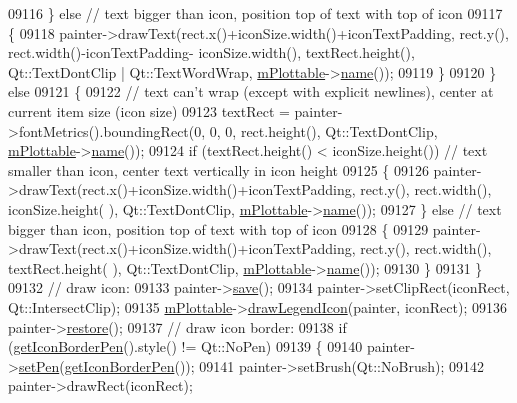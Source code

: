 \begin{DoxyCode}
09116     \} \textcolor{keywordflow}{else} \textcolor{comment}{// text bigger than icon, position top of text with top of icon}
09117     \{
09118       painter->drawText(rect.x()+iconSize.width()+iconTextPadding, rect.y(), rect.width()-iconTextPadding-
      iconSize.width(), textRect.height(), Qt::TextDontClip | Qt::TextWordWrap, 
      \hyperlink{a00048_ada647fb4b22971a1a424e15b4f6af0d9}{mPlottable}->\hyperlink{a00024_a1affc1972938e4364a9325e4e4e4dcea}{name}());
09119     \}
09120   \} \textcolor{keywordflow}{else}
09121   \{
09122     \textcolor{comment}{// text can't wrap (except with explicit newlines), center at current item size (icon size)}
09123     textRect = painter->fontMetrics().boundingRect(0, 0, 0, rect.height(), Qt::TextDontClip, 
      \hyperlink{a00048_ada647fb4b22971a1a424e15b4f6af0d9}{mPlottable}->\hyperlink{a00024_a1affc1972938e4364a9325e4e4e4dcea}{name}());
09124     \textcolor{keywordflow}{if} (textRect.height() < iconSize.height()) \textcolor{comment}{// text smaller than icon, center text vertically in icon
       height}
09125     \{
09126       painter->drawText(rect.x()+iconSize.width()+iconTextPadding, rect.y(), rect.width(), iconSize.height(
      ), Qt::TextDontClip, \hyperlink{a00048_ada647fb4b22971a1a424e15b4f6af0d9}{mPlottable}->\hyperlink{a00024_a1affc1972938e4364a9325e4e4e4dcea}{name}());
09127     \} \textcolor{keywordflow}{else} \textcolor{comment}{// text bigger than icon, position top of text with top of icon}
09128     \{
09129       painter->drawText(rect.x()+iconSize.width()+iconTextPadding, rect.y(), rect.width(), textRect.height(
      ), Qt::TextDontClip, \hyperlink{a00048_ada647fb4b22971a1a424e15b4f6af0d9}{mPlottable}->\hyperlink{a00024_a1affc1972938e4364a9325e4e4e4dcea}{name}());
09130     \}
09131   \}
09132   \textcolor{comment}{// draw icon:}
09133   painter->\hyperlink{a00047_a8fd6821ee6fecbfa04444c9062912abd}{save}();
09134   painter->setClipRect(iconRect, Qt::IntersectClip);
09135   \hyperlink{a00048_ada647fb4b22971a1a424e15b4f6af0d9}{mPlottable}->\hyperlink{a00024_ab28af4bd3965813be4223d8092aed38b}{drawLegendIcon}(painter, iconRect);
09136   painter->\hyperlink{a00047_a64908e6298d5bbd83457dc987cc3a022}{restore}();
09137   \textcolor{comment}{// draw icon border:}
09138   \textcolor{keywordflow}{if} (\hyperlink{a00048_ab36270e6b022a6961fa44136f35c0e4b}{getIconBorderPen}().style() != Qt::NoPen)
09139   \{
09140     painter->\hyperlink{a00047_af9c7a4cd1791403901f8c5b82a150195}{setPen}(\hyperlink{a00048_ab36270e6b022a6961fa44136f35c0e4b}{getIconBorderPen}());
09141     painter->setBrush(Qt::NoBrush);
09142     painter->drawRect(iconRect);

\end{DoxyCode}
